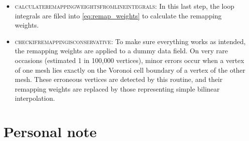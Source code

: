 \documentclass{article}
\begin{document}
\begin{itemize}
\item \textsc{calculate\textunderscore remapping\textunderscore weights\textunderscore from\textunderscore line\textunderscore integrals}: In this last step, the loop integrals are filed into \eqref{eq:remap_weights} to calculate the remapping weights.
\item \textsc{check\textunderscore if\textunderscore remapping\textunderscore is\textunderscore conservative}: To make sure everything works as intended, the remapping weights are applied to a dummy data field. On very rare occasions (estimated 1 in 100,000 vertices), minor errors occur when a vertex of one mesh lies exactly on the Voronoi cell boundary of a vertex of the other mesh. These erroneous vertices are detected by this routine, and their remapping weights are replaced by those representing simple bilinear interpolation.
\end{itemize}

\newpage
\section{Personal note}
\end{document}
